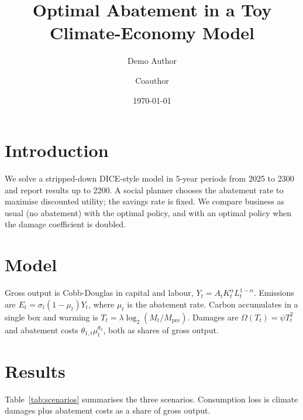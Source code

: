 \documentclass[11pt]{article}
\title{Optimal Abatement in a Toy Climate-Economy Model}
\author{Demo Author \and Coauthor}
\date{\today}
\begin{document}
\maketitle

\section{Introduction}
We solve a stripped-down DICE-style model in 5-year periods from 2025 to 2300
and report results up to 2200. A social planner chooses the abatement rate to
maximise discounted utility; the savings rate is fixed. We compare business as
usual (no abatement) with the optimal policy, and with an optimal policy when
the damage coefficient is doubled.

\section{Model}
Gross output is Cobb-Douglas in capital and labour,
$Y_t = A_t K_t^{\alpha} L_t^{1-\alpha}$. Emissions are
$E_t = \sigma_t (1-\mu_t) Y_t$, where $\mu_t$ is the abatement rate. Carbon
accumulates in a single box and warming is
$T_t = \lambda \log_2(M_t / M_{\text{pre}})$. Damages are
$\Omega(T_t) = \psi T_t^2$ and abatement costs $\theta_{1,t}\mu_t^{\theta_2}$, both
as shares of gross output.

\section{Results}
Table~\ref{tab:scenarios} summarises the three scenarios. Consumption loss is
climate damages plus abatement costs as a share of gross output.

\begin{table}[ht]
\centering
\caption{Scenario results}
\label{tab:scenarios}

\end{table}
\end{document}
